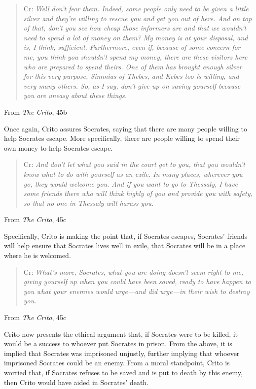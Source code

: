 \documentclass[letterpaper]{article}
\begin{document}
\begin{itemize}
    \begin{mdframed}[]
        \begin{quotation}
            Cr: \emph{Well don't fear them. Indeed, some people only need to be given a little silver and they're willing to rescue you and get you out of here. And on top of that, don't you see how cheap those informers are and that we wouldn't need to spend a lot of money on them? My money is at your disposal, and is, I think, sufficient. Furthermore, even if, because of some concern for me, you think you shouldn't spend my money, there are these visitors here who are prepared to spend theirs. One of them has brought enough silver for this very purpose, Simmias of Thebes, and Kebes too is willing, and very many others. So, as I say, don't give up on saving yourself because you are uneasy about these things.}
        \end{quotation}
        From \emph{The Crito}, 45b
    \end{mdframed}
    Once again, Crito assures Socrates, saying that there are many people willing to help Socrates escape. More specifically, there are people willing to spend their own money to help Socrates escape. 

    \begin{mdframed}[]
        \begin{quotation}
            Cr: \emph{And don't let what you said in the court get to you, that you wouldn't know what to do with yourself as an exile. In many places, wherever you go, they would welcome you. And if you want to go to Thessaly, I have some friends there who will think highly of you and provide you with safety, so that no one in Thessaly will harass you.}
        \end{quotation}
        From \emph{The Crito}, 45c
    \end{mdframed}
    Specifically, Crito is making the point that, if Socrates escapes, Socrates' friends will help ensure that Socrates lives well in exile, that Socrates will be in a place where he is welcomed. 

    \begin{mdframed}[]
        \begin{quotation}
            Cr: \emph{What's more, Socrates, what you are doing doesn't seem right to me, giving yourself up when you could have been saved, ready to have happen to you what your enemies would urge—and did urge—in their wish to destroy you.}
        \end{quotation}
        From \emph{The Crito}, 45c
    \end{mdframed}
    Crito now presents the ethical argument that, if Socrates were to be killed, it would be a success to whoever put Socrates in prison. From the above, it is implied that Socrates was imprisoned unjustly, further implying that whoever imprisoned Socrates could be an enemy. From a moral standpoint, Crito is worried that, if Socrates refuses to be saved and is put to death by this enemy, then Crito would have aided in Socrates' death. 



\end{itemize}
\end{document}
